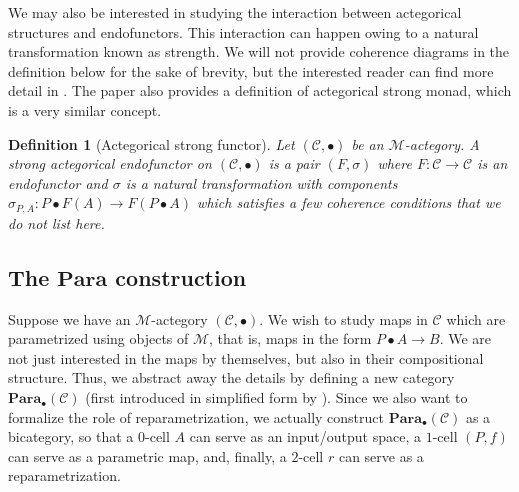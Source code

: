\documentclass[11pt,a4paper,openright,twoside]{report}
\newcounter{mycounter}
\theoremstyle{plain}
\newtheorem{definition}[mycounter]{Definition}
\theoremstyle{definition}
\begin{document}
We may also be interested in studying the interaction between actegorical structures and endofunctors. This interaction can happen owing to a natural transformation known as strength. We will not provide coherence diagrams in the definition below for the sake of brevity, but the interested reader can find more detail in \cite{gavranovicposition}. The paper also provides a definition of actegorical strong monad, which is a very similar concept.

\begin{definition}[Actegorical strong functor]
  Let $(\mathcal{C}, \bullet)$ be an $\mathcal{M}$-actegory. A strong actegorical endofunctor on $(\mathcal{C}, \bullet)$ is a pair $(F, \sigma)$ where $F: \mathcal{C} \to \mathcal{C}$ is an endofunctor and $\sigma$ is a natural transformation with components $\sigma_{P,A}: P \bullet F(A) \to F(P \bullet A)$ which satisfies a few coherence conditions that we do not list here.
\end{definition}

\subsection{The $\mathbf{Para}$ construction}

Suppose we have an $\mathcal{M}$-actegory $(\mathcal{C}, \bullet)$. We wish to study maps in $\mathcal{C}$ which are parametrized using objects of $\mathcal{M}$, that is, maps in the form $P \bullet A \to B$. We are not just interested in the maps by themselves, but also in their compositional structure. Thus, we abstract away the details by defining a new category $\mathbf{Para}_{\bullet}(\mathcal{C})$ (first introduced in simplified form by \cite{fong2019backprop}). Since we also want to formalize the role of reparametrization, we actually construct $\mathbf{Para}_{\bullet}(\mathcal{C})$ as a bicategory, so that a $0$-cell $A$ can serve as an input/output space, a $1$-cell $(P,f)$ can serve as a parametric map, and, finally, a $2$-cell $r$ can serve as a reparametrization.
\end{document}
